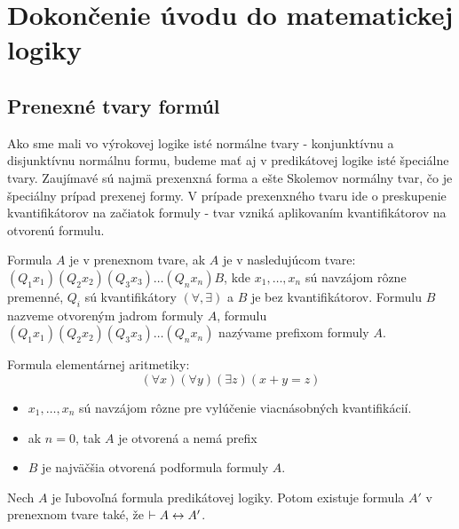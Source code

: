 \chapter{Dokončenie úvodu do matematickej logiky}

\section{Prenexné tvary formúl}

Ako sme mali vo výrokovej logike isté normálne tvary - konjunktívnu a
disjunktívnu normálnu formu, budeme mať aj v predikátovej logike isté
špeciálne tvary. Zaujímavé sú najmä prexenxná forma a ešte Skolemov
normálny tvar, čo je špeciálny prípad prexenej formy.
V prípade prexenxného tvaru ide o preskupenie kvantifikátorov na
začiatok formuly - tvar vzniká aplikovaním kvantifikátorov na otvorenú
formulu.


\begin{definicia}
    Formula $A$ je v prenexnom tvare, ak $A$ je v nasledujúcom tvare:
     $(Q_1 x_1) (Q_2 x_2) (Q_3 x_3) \dots (Q_n x_n) B$, kde
     $x_1, \dots , x_n$ sú navzájom rôzne premenné, $Q_i$ sú
     kvantifikátory $(\forall, \exists)$ a 
     $B$ je bez kvantifikátorov.
    Formulu $B$ nazveme otvoreným jadrom formuly $A$, 
    formulu $(Q_1 x_1) (Q_2 x_2) (Q_3 x_3) \dots (Q_n x_n)$ nazývame
    prefixom formuly $A$.
\end{definicia}

\begin{priklad}
    Formula elementárnej aritmetiky:
    \begin{equation*}
        (\forall x) (\forall y) (\exists z) (x+y=z)
    \end{equation*}
\end{priklad}

\begin{itemize}
 \item $x_1, \dots, x_n$ sú navzájom rôzne pre vylúčenie viacnásobných
    kvantifikácií.
 \item ak $n=0$, tak $A$ je otvorená a nemá prefix
 \item $B$ je najväčšia otvorená podformula formuly $A$.
\end{itemize}


\begin{veta}
 Nech $A$ je ľubovoľná formula predikátovej logiky. Potom existuje
 formula $A'$ v prenexnom tvare také, že
 $\vdash A \leftrightarrow A'$.
\end{veta}


